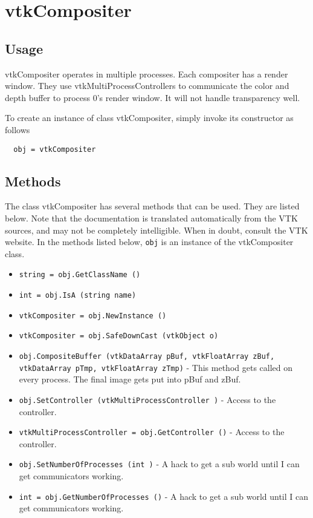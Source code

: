 \section{vtkCompositer}

\subsection{Usage}

 vtkCompositer operates in multiple processes.  Each compositer has 
 a render window.  They use vtkMultiProcessControllers to communicate 
 the color and depth buffer to process 0's render window.
 It will not handle transparency well.


To create an instance of class vtkCompositer, simply
invoke its constructor as follows
\begin{verbatim}
  obj = vtkCompositer
\end{verbatim}
\subsection{Methods}

The class vtkCompositer has several methods that can be used.
  They are listed below.
Note that the documentation is translated automatically from the VTK sources,
and may not be completely intelligible.  When in doubt, consult the VTK website.
In the methods listed below, \verb|obj| is an instance of the vtkCompositer class.
\begin{itemize}
\item  \verb|string = obj.GetClassName ()|

\item  \verb|int = obj.IsA (string name)|

\item  \verb|vtkCompositer = obj.NewInstance ()|

\item  \verb|vtkCompositer = obj.SafeDownCast (vtkObject o)|

\item  \verb|obj.CompositeBuffer (vtkDataArray pBuf, vtkFloatArray zBuf, vtkDataArray pTmp, vtkFloatArray zTmp)| -  This method gets called on every process.  The final image gets
 put into pBuf and zBuf.

\item  \verb|obj.SetController (vtkMultiProcessController )| -  Access to the controller.

\item  \verb|vtkMultiProcessController = obj.GetController ()| -  Access to the controller.

\item  \verb|obj.SetNumberOfProcesses (int )| -  A hack to get a sub world until I can get communicators working.

\item  \verb|int = obj.GetNumberOfProcesses ()| -  A hack to get a sub world until I can get communicators working.

\end{itemize}
